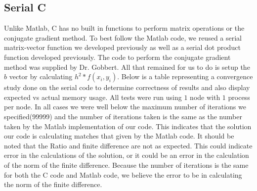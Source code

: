 \documentclass[11pt]{article}
\begin{document}
\subsection{Serial C}
Unlike Matlab, C has no built in functions to perform matrix operations or the conjugate gradient method. To best follow the Matlab code, we reused a serial matrix-vector function we developed previously as well as a serial dot product function developed previously. The code to perform the conjugate gradient method was supplied by Dr. Gobbert. All that remained for us to do is setup the $b$ vector by calculating $h^2 * f(x_i, y_i)$. Below is a table representing a convergence study done on the serial code to determine correctness of results and also display expected vs actual memory usage. All tests were run using $1$ node with $1$ process per node. In all cases we were well below the maximum number of iterations we specified(99999) and the number of iterations taken is the same as the number taken by the Matlab implementation of our code. This indicates that the solution our code is calculating matches that given by the Matlab code. It should be noted that the Ratio and finite difference are not as expected. This could indicate error in the calculations of the solution, or it could be an error in the calculation of the norm of the finite difference. Because the number of iterations is the same for both the C code and Matlab code, we believe the error to be in calculating the norm of the finite difference.
\end{document}
